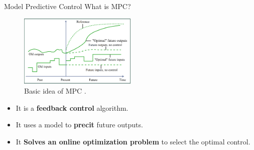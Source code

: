 \documentclass{thesisbeamer}
\begin{document}
\begin{frame}[t]{Model Predictive Control} 
What is MPC?

 \begin{figure}[t]
 \centering
 \includegraphics[width=0.5\textwidth]{Images/control/MPC_general_idea}
 \caption{Basic idea of MPC \cite{How2008}.}
 \label{MPC_basic_idea}
\end{figure}  



\begin{itemize}[<+->]
	\item It is a \textbf{feedback control} algorithm.
	\item It uses a model to \textbf{precit} future outputs.
	\item It \textbf{Solves an online optimization problem} to select the optimal control.
\end{itemize}
\end{frame}
\end{document}
